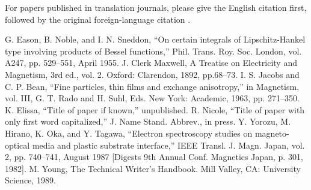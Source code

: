 \documentclass[conference]{IEEEtran}
\begin{document}
For papers published in translation journals, please give the English 
citation first, followed by the original foreign-language citation \cite{b6}.

\begin{thebibliography}{00}
 G. Eason, B. Noble, and I. N. Sneddon, ``On certain integrals of Lipschitz-Hankel type involving products of Bessel functions,'' Phil. Trans. Roy. Soc. London, vol. A247, pp. 529--551, April 1955.
 J. Clerk Maxwell, A Treatise on Electricity and Magnetism, 3rd ed., vol. 2. Oxford: Clarendon, 1892, pp.68--73.
 I. S. Jacobs and C. P. Bean, ``Fine particles, thin films and exchange anisotropy,'' in Magnetism, vol. III, G. T. Rado and H. Suhl, Eds. New York: Academic, 1963, pp. 271--350.
 K. Elissa, ``Title of paper if known,'' unpublished.
 R. Nicole, ``Title of paper with only first word capitalized,'' J. Name Stand. Abbrev., in press.
 Y. Yorozu, M. Hirano, K. Oka, and Y. Tagawa, ``Electron spectroscopy studies on magneto-optical media and plastic substrate interface,'' IEEE Transl. J. Magn. Japan, vol. 2, pp. 740--741, August 1987 [Digests 9th Annual Conf. Magnetics Japan, p. 301, 1982].
 M. Young, The Technical Writer's Handbook. Mill Valley, CA: University Science, 1989.
\end{thebibliography}
\end{document}
